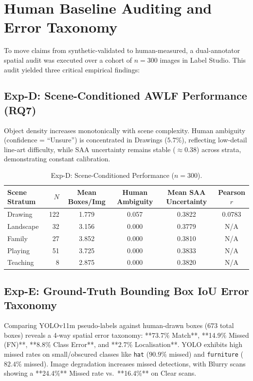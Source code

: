 \documentclass[11pt,a4paper]{article}
\begin{document}
\section{Human Baseline Auditing and Error Taxonomy}
To move claims from synthetic-validated to human-measured, a dual-annotator spatial audit was executed over a cohort of $n=300$ images in Label Studio. This audit yielded three critical empirical findings:

\subsection{Exp-D: Scene-Conditioned AWLF Performance (RQ7)}
Object density increases monotonically with scene complexity. Human ambiguity (confidence = ``Unsure'') is concentrated in Drawings ($5.7\%$), reflecting low-detail line-art difficulty, while SAA uncertainty remains stable ($\approx 0.38$) across strata, demonstrating constant calibration.

\begin{table}[h]
\centering
\caption{Exp-D: Scene-Conditioned Performance ($n=300$).}
\label{tab:exp_d}
\begin{tabular}{lrcccc}
\toprule
\textbf{Scene Stratum} & \textbf{$N$} & \textbf{Mean Boxes/Img} & \textbf{Human Ambiguity} & \textbf{Mean SAA Uncertainty} & \textbf{Pearson $r$} \\
\midrule
Drawing   & 122 & 1.779 & 0.057 & 0.3822 & 0.0783 \\
Landscape &  32 & 3.156 & 0.000 & 0.3779 & N/A \\
Family    &  27 & 3.852 & 0.000 & 0.3810 & N/A \\
Playing   &  51 & 3.725 & 0.000 & 0.3833 & N/A \\
Teaching  &   8 & 2.875 & 0.000 & 0.3820 & N/A \\
\bottomrule
\end{tabular}
\end{table}

\subsection{Exp-E: Ground-Truth Bounding Box IoU Error Taxonomy}
Comparing YOLOv11m pseudo-labels against human-drawn boxes ($673$ total boxes) reveals a 4-way spatial error taxonomy: **73.7\% Match**, **14.9\% Missed (FN)**, **8.8\% Class Error**, and **2.7\% Localisation**. YOLO exhibits high missed rates on small/obscured classes like \texttt{hat} ($90.9\%$ missed) and \texttt{furniture} ($82.4\%$ missed). Image degradation increases missed detections, with Blurry scans showing a **24.4\%** Missed rate vs.\ **16.4\%** on Clear scans.
\end{document}
